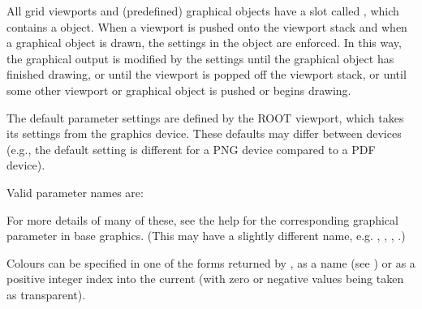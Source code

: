 \begin{Details}\relax
All grid viewports and (predefined) graphical objects have a slot
called , which contains a  object.  When
a viewport is pushed onto the viewport stack and when a graphical object
is drawn, the settings in the  object are enforced.
In this way, the graphical output is modified by the 
settings until the graphical object has finished drawing, or until the
viewport is popped off the viewport stack, or until some other
viewport or graphical object is pushed or begins drawing.

The default parameter settings are defined by the ROOT viewport,
which takes its settings from the graphics device.
These
defaults may differ between devices (e.g., the default 
setting is different for a PNG device compared to a PDF device).

Valid parameter names are:

For more details of many of these, see the help for the corresponding
graphical parameter  in base graphics.  (This may
have a slightly different name, e.g. , ,
, .)

Colours can be specified in one of the forms returned by
, as a name (see ) or as a
positive integer index into the current  (with zero or
negative values being taken as transparent).


\end{Details}
